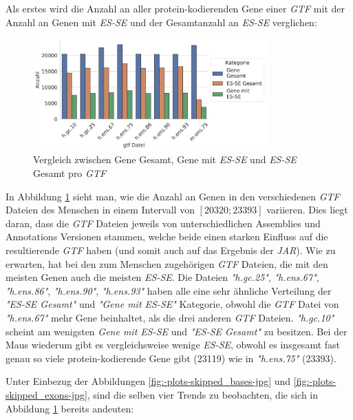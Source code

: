\documentclass[12pt]{article}
\begin{document}
Als erstes wird die Anzahl an aller protein-kodierenden Gene einer \textit{GTF} mit der Anzahl an Genen mit \textit{ES-SE} und der Gesamtanzahl an \textit{ES-SE}
verglichen:

\begin{figure}[htpb]
	\centering
	\includegraphics[width=0.8\textwidth]{./plots/genes.jpg}
	\caption{Vergleich zwischen Gene Gesamt, Gene mit \textit{ES-SE} und \textit{ES-SE} Gesamt pro \textit{GTF}}
	\label{fig:-plots-genes-jpg}
\end{figure}

In Abbildung \ref{fig:-plots-genes-jpg} sieht man, wie die Anzahl an Genen in den verschiedenen \textit{GTF} Dateien des
Menschen in einem Intervall von $[20320; 23393]$ variieren. Dies liegt daran, dass die
\textit{GTF} Dateien jeweils von unterschiedlichen Assemblies und Annotations Versionen stammen,
welche beide einen starken Einfluss auf die resultierende \textit{GTF} haben (und somit auch auf das Ergebnis der \textit{JAR}).
Wie zu erwarten, hat bei den zum Menschen zugehörigen \textit{GTF} Dateien, die mit den meisten Genen auch die meisten \textit{ES-SE}.
Die Dateien \textit{"h.gc.25"}, \textit{"h.ens.67"}, \textit{"h.ens.86"}, \textit{"h.ens.90"}, \textit{"h.ens.93"} haben alle eine sehr
ähnliche Verteilung der \textit{"ES-SE Gesamt"} und \textit{"Gene mit ES-SE"} Kategorie, obwohl die \textit{GTF} Datei von
\textit{"h.ens.67"} mehr Gene beinhaltet, als die drei anderen \textit{GTF} Dateien.
\textit{"h.gc.10"} scheint am wenigsten \textit{Gene mit ES-SE} und \textit{"ES-SE Gesamt"} zu besitzen.
Bei der Maus wiederum gibt es vergleichsweise wenige \textit{ES-SE}, obwohl es insgesamt fast genau so viele
protein-kodierende Gene gibt (23119) wie in \textit{"h.ens.75"} (23393).

Unter Einbezug der Abbildungen \ref{fig:-plots-skipped_bases-jpg} und \ref{fig:-plots-skipped_exons-jpg}, sind die
selben vier Trends zu beobachten, die sich in Abbildung \ref{fig:-plots-genes-jpg} bereits andeuten:
\end{document}
